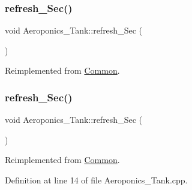 \mbox{\label{class_aeroponics___tank_a9b1c9377aec2a453e4562bca5ae7afa2}} 
\subsubsection{\texorpdfstring{refresh\+\_\+\+Sec()}{refresh\_Sec()}\hspace{0.1cm}{\footnotesize\ttfamily [1/2]}}
{\footnotesize\ttfamily void Aeroponics\+\_\+\+Tank\+::refresh\+\_\+\+Sec (\begin{DoxyParamCaption}{ }\end{DoxyParamCaption})\hspace{0.3cm}{\ttfamily [virtual]}}



Reimplemented from \hyperlink{class_common_acd1fdd47fbf8bb490f5c6d3ab6cd8d05}{Common}.

\mbox{\label{class_aeroponics___tank_a9b1c9377aec2a453e4562bca5ae7afa2}} 
\subsubsection{\texorpdfstring{refresh\+\_\+\+Sec()}{refresh\_Sec()}\hspace{0.1cm}{\footnotesize\ttfamily [2/2]}}
{\footnotesize\ttfamily void Aeroponics\+\_\+\+Tank\+::refresh\+\_\+\+Sec (\begin{DoxyParamCaption}{ }\end{DoxyParamCaption})\hspace{0.3cm}{\ttfamily [virtual]}}



Reimplemented from \hyperlink{class_common_acd1fdd47fbf8bb490f5c6d3ab6cd8d05}{Common}.



Definition at line 14 of file Aeroponics\+\_\+\+Tank.\+cpp.

